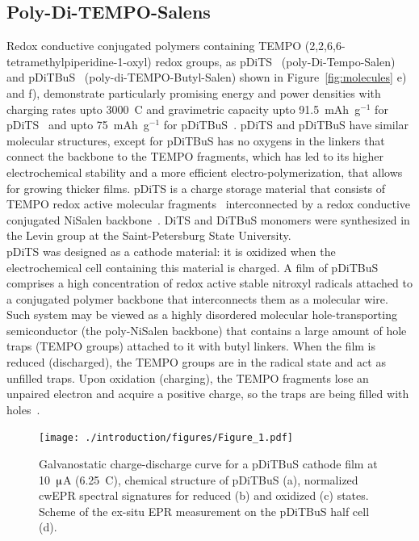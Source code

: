 \subsection{Poly-Di-TEMPO-Salens}
Redox conductive conjugated polymers containing TEMPO (2,2,6,6-tetramethylpiperidine-1-oxyl) redox groups, as pDiTS~\cite{Vereshchagin2020,Kulikov2022} (poly-Di-Tempo-Salen) and pDiTBuS~\cite{Kulikov2023} (poly-di-TEMPO-Butyl-Salen) shown in Figure~\ref{fig:molecules} e) and f), demonstrate particularly promising energy and power densities with charging rates upto 3000~C and gravimetric capacity upto 91.5~mAh~g$^{-1}$ for pDiTS~\cite{Vereshchagin2020} and upto 75~mAh~g$^{-1}$ for pDiTBuS~\cite{Kulikov2023}. pDiTS and pDiTBuS have similar molecular structures, except for pDiTBuS has no oxygens in the linkers that connect the backbone to the TEMPO fragments, which has led to its higher electrochemical stability and a more efficient electro-polymerization, that allows for growing thicker films. pDiTS is a charge storage material that consists of TEMPO redox active molecular fragments~\cite{Vereshchagin2022,jeschke2012_annrevphyschem,Halbmair2016} interconnected by a redox conductive conjugated NiSalen backbone~\cite{Vereshchagin2020,Dmitrieva2018}. DiTS and DiTBuS monomers were synthesized in the Levin group at the Saint-Petersburg State University.\\
pDiTS was designed as a cathode material: it is oxidized when the electrochemical cell containing this material is charged. A film of pDiTBuS comprises a high concentration of redox active stable nitroxyl radicals attached to a conjugated polymer backbone that interconnects them as a molecular wire. Such system may be viewed as a highly disordered molecular hole-transporting semiconductor (the poly-NiSalen backbone) that contains a large amount of hole traps (TEMPO groups) attached to it with butyl linkers. When the film is reduced (discharged), the TEMPO groups are in the radical state and act as unfilled traps. Upon oxidation (charging), the TEMPO fragments lose an unpaired electron and acquire a positive charge, so the traps are being filled with holes~\cite{Kulikov2023}.

\begin{figure}[h]
\center
	\texttt{[image: ./introduction/figures/Figure\_1.pdf]}
	\caption{Galvanostatic charge-discharge curve for a pDiTBuS cathode film at 10~$\muup$A (6.25~C), chemical structure of pDiTBuS (a), normalized cwEPR spectral signatures for reduced (b) and oxidized (c) states. Scheme of the ex-situ EPR measurement on the pDiTBuS half cell (d).}
	\label{fig:Figure_1}
\end{figure}



